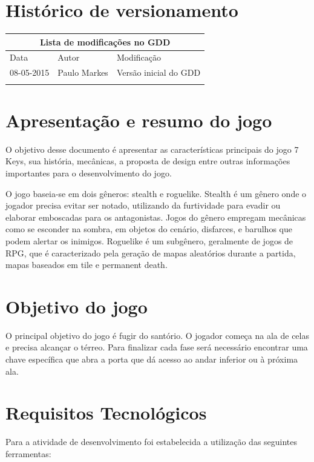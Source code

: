 \documentclass{article}
\begin{document}

\onehalfspacing
\tableofcontents
\pagebreak
\section{Histórico de versionamento}
\begin{longtable}{|l|l|l|}
\hline
\multicolumn{3}{|c|}{Lista de modificações no GDD}
\\
\hline
Data & Autor & Modificação
\\
\hline
08-05-2015 & Paulo Markes & Versão inicial do GDD
\\
\hline
\\
\hline
\end{longtable}
\newpage
\section{Apresentação e resumo do jogo}
     O objetivo desse documento é apresentar as características principais do jogo 7 Keys, sua história, mecânicas, a proposta de design entre outras informações importantes para o desenvolvimento do jogo.
     
     O jogo baseia-se em dois gêneros: stealth e roguelike. Stealth é um gênero onde o jogador precisa evitar ser notado, utilizando da furtividade para evadir ou elaborar emboscadas para os antagonistas. Jogos do gênero empregam mecânicas como se esconder na sombra, em objetos do cenário, disfarces, e barulhos que podem alertar os inimigos. Roguelike é um subgênero, geralmente de jogos de RPG, que é caracterizado pela geração de mapas aleatórios durante a partida, mapas baseados em tile e permanent death.

\section{Objetivo do jogo}
O principal objetivo do jogo é fugir do santório. O jogador começa na ala de celas e precisa alcançar o térreo. Para finalizar cada fase será necessário encontrar uma chave específica que abra a porta que dá acesso ao andar inferior ou à próxima ala.
 
\section{Requisitos Tecnológicos}
Para a atividade de desenvolvimento foi estabelecida a utilização das seguintes ferramentas:
\end{document}
